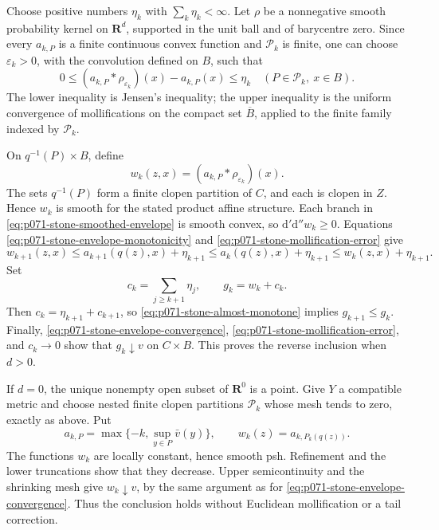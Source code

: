 Choose positive numbers \(\eta_k\) with
\(\sum_k\eta_k<\infty\).  Let \(\rho\) be a nonnegative smooth
probability kernel on \(\mathbf R^d\), supported in the unit ball and of
barycentre zero.  Since every \(a_{k,P}\) is a finite continuous convex
function and \(\mathcal P_k\) is finite, one can choose
\(\varepsilon_k>0\), with the convolution defined on \(B\), such that
\begin{equation}
\label{eq:p071-stone-mollification-error}
  0\leq
  (a_{k,P}*\rho_{\varepsilon_k})(x)-a_{k,P}(x)
  \leq\eta_k
  \quad(P\in\mathcal P_k,\ x\in B).
\end{equation}
The lower inequality is Jensen's inequality; the upper inequality is the
uniform convergence of mollifications on the compact set
\(\overline B\), applied to the finite family indexed by
\(\mathcal P_k\).

On \(q^{-1}(P)\times B\), define
\begin{equation}
\label{eq:p071-stone-smoothed-envelope}
                 w_k(z,x)=
                 (a_{k,P}*\rho_{\varepsilon_k})(x).
\end{equation}
The sets \(q^{-1}(P)\) form a finite clopen partition of \(C\), and each is
clopen in \(Z\).  Hence
\(w_k\) is smooth for the stated product affine structure.  Each branch in
\eqref{eq:p071-stone-smoothed-envelope} is smooth convex, so
\(\mathrm d'\mathrm d''w_k\geq0\).  Equations
\eqref{eq:p071-stone-envelope-monotonicity} and
\eqref{eq:p071-stone-mollification-error} give
\begin{equation}
\label{eq:p071-stone-almost-monotone}
 w_{k+1}(z,x)
 \leq a_{k+1}(q(z),x)+\eta_{k+1}
 \leq a_k(q(z),x)+\eta_{k+1}
 \leq w_k(z,x)+\eta_{k+1}.
\end{equation}
Set
\begin{equation}
\label{eq:p071-stone-tail-correction}
                       c_k=\sum_{j\geq k+1}\eta_j,
             \qquad   g_k=w_k+c_k.
\end{equation}
Then \(c_k=\eta_{k+1}+c_{k+1}\), so
\eqref{eq:p071-stone-almost-monotone} implies \(g_{k+1}\leq g_k\).
Finally, \eqref{eq:p071-stone-envelope-convergence},
\eqref{eq:p071-stone-mollification-error}, and \(c_k\to0\) show
that \(g_k\downarrow v\) on \(C\times B\).  This proves the reverse
inclusion when \(d>0\).

If \(d=0\), the unique nonempty open subset of \(\mathbf R^0\) is a point.
Give \(Y\) a compatible metric and choose nested finite clopen partitions
\(\mathcal P_k\) whose mesh tends to zero, exactly as above.  Put
\begin{equation}
\label{eq:p071-stone-zero-dimensional-envelope}
        a_{k,P}=\max\{-k,\sup_{y\in P}\bar v(y)\},
        \qquad w_k(z)=a_{k,P_k(q(z))}.
\end{equation}
The functions \(w_k\) are locally constant, hence smooth psh.  Refinement
and the lower truncations show that they decrease.  Upper semicontinuity
and the shrinking mesh give \(w_k\downarrow v\), by the same argument as
for \eqref{eq:p071-stone-envelope-convergence}.  Thus the conclusion holds
without Euclidean mollification or a tail correction.

